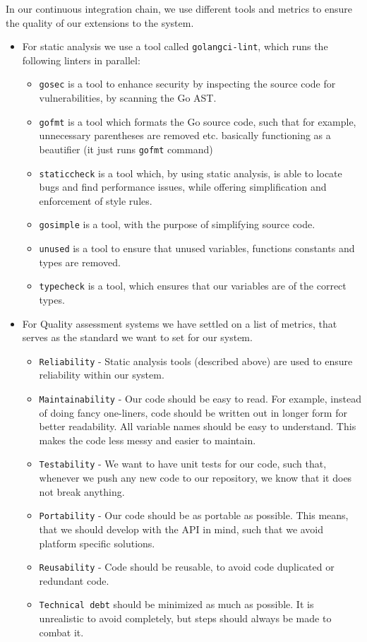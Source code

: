 In our continuous integration chain, we use different tools and metrics to ensure the quality of our extensions to the system.
\begin{itemize}
    \item For static analysis we use a tool called \texttt{golangci-lint}, which runs the following linters in parallel:
    \begin{itemize}
        \item \texttt{gosec} is a tool to enhance security by inspecting the source code for vulnerabilities, by scanning the Go AST.
        \item \texttt{gofmt} is a tool which formats the Go source code, such that for example, unnecessary parentheses are removed etc. basically functioning as a beautifier (it just runs \texttt{gofmt} command)
        \item \texttt{staticcheck} is a tool which, by using static analysis, is able to locate bugs and find performance issues, while offering simplification and enforcement of style rules.
        \item \texttt{gosimple} is a tool, with the purpose of simplifying source code.
        \item \texttt{unused} is a tool to ensure that unused variables, functions constants and types are removed.
        \item \texttt{typecheck} is a tool, which ensures that our variables are of the correct types.
    \end{itemize}
    \item For Quality assessment systems we have settled on a list of metrics, that serves as the standard we want to set for our system.
    \begin{itemize}
        \item \texttt{Reliability} - Static analysis tools (described above) are used to ensure reliability within our system.
        \item \texttt{Maintainability} - Our code should be easy to read. For example, instead of doing fancy one-liners, code should be written out in longer form for better readability. All variable names should be easy to understand. This makes the code less messy and easier to maintain.
        \item \texttt{Testability} - We want to have unit tests for our code, such that, whenever we push any new code to our repository, we know that it does not break anything.
        \item \texttt{Portability} - Our code should be as portable as possible. This means, that we should develop with the API in mind, such that we avoid platform specific solutions.
        \item \texttt{Reusability} - Code should be reusable, to avoid code duplicated or redundant code. 
        \item \texttt{Technical debt} should be minimized as much as possible. It is unrealistic to avoid completely, but steps should always be made to combat it. 
        

\end{itemize}
\end{itemize}
